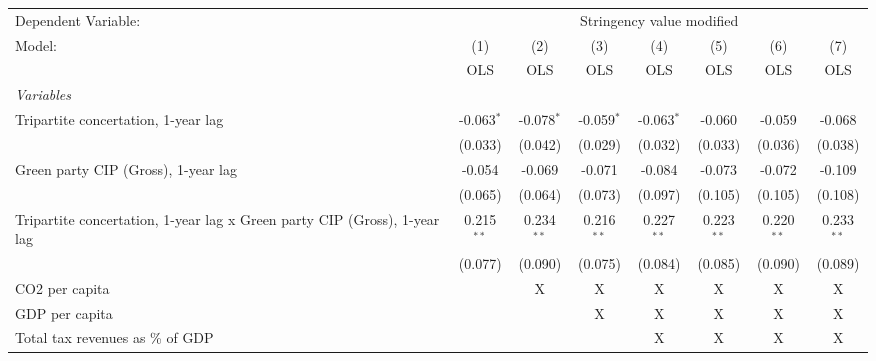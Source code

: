 
\begingroup
\centering
\begin{tabular}{lccccccc}
   \toprule
   Dependent Variable: & \multicolumn{7}{c}{Stringency value modified}\\
   Model:                                                                    & (1)          & (2)          & (3)          & (4)          & (5)          & (6)          & (7)\\  
                                                                             &  OLS         & OLS          & OLS          & OLS          & OLS          & OLS          & OLS\\  
   \midrule
   \emph{Variables}\\
   Tripartite concertation, 1-year lag                                       & -0.063$^{*}$ & -0.078$^{*}$ & -0.059$^{*}$ & -0.063$^{*}$ & -0.060       & -0.059       & -0.068\\   
                                                                             & (0.033)      & (0.042)      & (0.029)      & (0.032)      & (0.033)      & (0.036)      & (0.038)\\   
   Green party CIP (Gross), 1-year lag                                       & -0.054       & -0.069       & -0.071       & -0.084       & -0.073       & -0.072       & -0.109\\   
                                                                             & (0.065)      & (0.064)      & (0.073)      & (0.097)      & (0.105)      & (0.105)      & (0.108)\\   
   Tripartite concertation, 1-year lag x Green party CIP (Gross), 1-year lag & 0.215$^{**}$ & 0.234$^{**}$ & 0.216$^{**}$ & 0.227$^{**}$ & 0.223$^{**}$ & 0.220$^{**}$ & 0.233$^{**}$\\   
                                                                             & (0.077)      & (0.090)      & (0.075)      & (0.084)      & (0.085)      & (0.090)      & (0.089)\\   
   CO2 per capita                                                            &              & X            & X            & X            & X            & X            & X\\  
   GDP per capita                                                            &              &              & X            & X            & X            & X            & X\\  
   Total tax revenues as \% of GDP                                           &              &              &              & X            & X            & X            & X\\  

\end{tabular}
